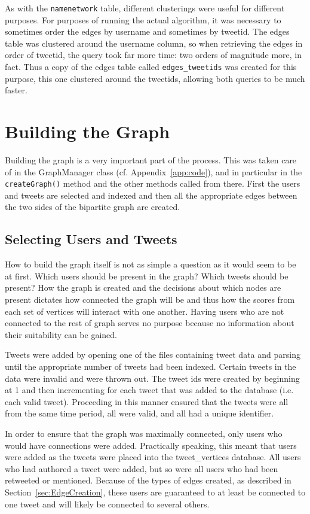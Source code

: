 As with the \texttt{namenetwork} table, different clusterings were useful for different purposes. For purposes of running the actual algorithm, it was necessary to sometimes order the edges by username and sometimes by tweetid. The edges table was clustered around the username column, so when retrieving the edges in order of tweetid, the query took far more time: two orders of magnitude more, in fact. Thus a copy of the edges table called \texttt{edges\_tweetids} was created for this purpose, this one clustered around the tweetids, allowing both queries to be much faster.

\section{Building the Graph}
\label{sec:BuildingTheGraph}

Building the graph is a very important part of the process. This was taken care of in the GraphManager class (cf. Appendix~\ref{app:code}), and in particular in the \texttt{createGraph()} method and the other methods called from there. First the users and tweets are selected and indexed and then all the appropriate edges between the two sides of the bipartite graph are created.

\subsection{Selecting Users and Tweets}

How to build the graph itself is not as simple a question as it would seem to be at first. Which users should be present in the graph? Which tweets should be present? How the graph is created and the decisions about which nodes are present dictates how connected the graph will be and thus how the scores from each set of vertices will interact with one another. Having users who are not connected to the rest of graph serves no purpose because no information about their suitability can be gained.

Tweets were added by opening one of the files containing tweet data and parsing until the appropriate number of tweets had been indexed. Certain tweets in the data were invalid and were thrown out. The tweet ids were created by beginning at 1 and then incrementing for each tweet that was added to the database (i.e. each valid tweet). Proceeding in this manner ensured that the tweets were all from the same time period, all were valid, and all had a unique identifier.

In order to ensure that the graph was maximally connected, only users who would have connections were added. Practically speaking, this meant that users were added as the tweets were placed into the tweet\_vertices database. All users who had authored a tweet were added, but so were all users who had been retweeted or mentioned. Because of the types of edges created, as described in Section~\ref{sec:EdgeCreation}, these users are guaranteed to at least be connected to one tweet and will likely be connected to several others.


